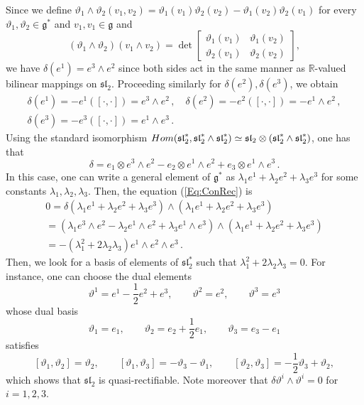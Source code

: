 \documentclass[12pt]{article}
\theoremstyle{plain}
\theoremstyle{definition}
\numberwithin{equation}{section}
\begin{document}
Since we define
$
\vartheta_1\wedge \vartheta_2(v_1,v_2)=\vartheta_1(v_1)\vartheta_2(v_2)-\vartheta_1(v_2)\vartheta_2(v_1)
$ for every $\vartheta_1,\vartheta_2\in \mathfrak{g}^*$ and $v_1,v_1\in \mathfrak{g}$ and
$$
(\vartheta_1\wedge \vartheta_2)(v_1\wedge v_2)=\det \left[\begin{array}{cc}\vartheta_1(v_1)&\vartheta_1(v_2)\\\vartheta_2(v_1)&\vartheta_2(v_2)\end{array}\right],
$$
we have $\delta(e^1)=e^3\wedge e^2$ since both sides act in the same manner as $\mathbb{R}$-valued bilinear mappings on $\mathfrak{sl}_2$. Proceeding similarly for $\delta(e^2),\delta(e^3)$, we obtain
\begin{gather*}
    \delta(e^1) = -e^1([\cdot,\cdot])=    e^3\wedge e^2\,,\quad
    \delta(e^2) = -e^2([\cdot,\cdot]) = - e^1\wedge e^2\,,\\
    \delta(e^3) = -e^3([\cdot,\cdot]) =  e^1\wedge e^3\,.
\end{gather*}
Using the standard isomorphism ${\rm Hom}(\mathfrak{sl}_2^*,\mathfrak{sl}_2^*\wedge \mathfrak{sl}_2^*)\simeq \mathfrak{sl}_2\otimes (\mathfrak{sl}_2^*\wedge \mathfrak{sl}_2^*)$, one has that 
$$ \delta =  e_1\otimes e^3\wedge e^2 -  e_2\otimes e^1\wedge e^2 +  e_3\otimes e^1\wedge e^3\,. $$
In this case, one can write a general element of $\mathfrak{g}^*$ as $\lambda_1e^1+\lambda_2e^2+\lambda_3e^3$ for some constants $\lambda_1,\lambda_2,\lambda_3$. Then, the equation (\ref{Eq:ConRec}) is
\begin{multline*}
    0 = \delta(\lambda_1e^1 + \lambda_2e^2 + \lambda_3e^3)\wedge(\lambda_1e^1 + \lambda_2e^2 + \lambda_3e^3)\\= \left( \lambda_1 e^3\wedge e^2 - \lambda_2e^1\wedge e^2 +  \lambda_3 e^1\wedge e^3 \right)\wedge(\lambda_1e^1 + \lambda_2e^2 + \lambda_3e^3)
    \\= -\left(\lambda_1^2 + 2\lambda_2\lambda_3\right) e^1\wedge e^2\wedge e^3\,.
\end{multline*}
Then, we look for a basis of elements of $\mathfrak{sl}_2^*$  such that $\lambda_1^2 + 2\lambda_2\lambda_3= 0$. For instance, one can choose the dual elements
$$
\vartheta^1=e^1-\frac 12 e^2+e^3,\qquad \vartheta^2=e^2,\qquad \vartheta^3=e^3
 $$   whose dual basis
 $$
 \vartheta_1=e_1,\qquad \vartheta_2=e_2+\frac 12 e_1,\qquad \vartheta_3=e_3-e_1
 $$
 satisfies  
 $$
 [\vartheta_1,\vartheta_2]=\vartheta_2,\qquad [\vartheta_1,\vartheta_3]=-\vartheta_3-\vartheta_1,\qquad [\vartheta_2,\vartheta_3]=-\frac 12\vartheta_3+\vartheta_2,
 $$
which shows that $\mathfrak{sl}_2$ is quasi-rectifiable. Note moreover that $\delta \vartheta^i\wedge\vartheta^i=0$ for $i=1,2,3$.
 
\end{document}
